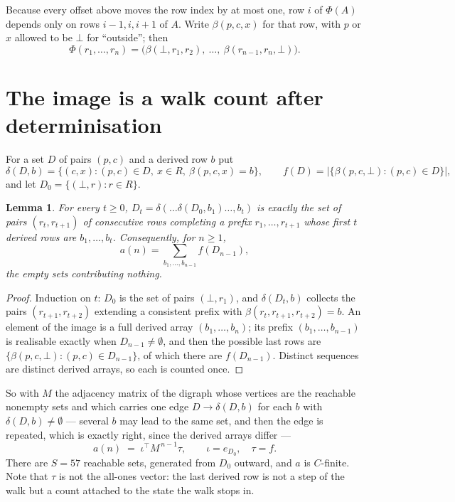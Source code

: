 \documentclass[11pt,a4paper]{article}
\theoremstyle{plain}
\newtheorem{lemma}[theorem]{Lemma}
\theoremstyle{definition}
\begin{document}
Because every offset above moves the row index by at most one, row $i$ of
$\Phi(A)$ depends only on rows $i-1,i,i+1$ of $A$. Write $\beta(p,c,x)$ for that row, with $p$
or $x$ allowed to be $\bot$ for ``outside''; then
\[
\Phi(r_1,\dots,r_n)=\bigl(\beta(\bot,r_1,r_2),\ \dots,\ \beta(r_{n-1},r_n,\bot)\bigr).
\]

\section{The image is a walk count after determinisation}

For a set $D$ of pairs $(p,c)$ and a derived row $b$ put
\[
\delta(D,b)=\{(c,x):(p,c)\in D,\ x\in R,\ \beta(p,c,x)=b\},\qquad
f(D)=\bigl|\{\beta(p,c,\bot):(p,c)\in D\}\bigr| ,
\]
and let $D_0=\{(\bot,r):r\in R\}$.

\begin{lemma}\label{lem:det}
For every $t\ge0$, $D_t=\delta(\dots\delta(D_0,b_1)\dots,b_t)$ is exactly the set of pairs
$(r_t,r_{t+1})$ of consecutive rows completing a prefix $r_1,\dots,r_{t+1}$ whose first $t$
derived rows are $b_1,\dots,b_t$. Consequently, for $n\ge1$,
\[
a(n)=\sum_{b_1,\dots,b_{n-1}}f(D_{n-1}),
\]
the empty sets contributing nothing.
\end{lemma}

\begin{proof}
Induction on $t$: $D_0$ is the set of pairs $(\bot,r_1)$, and $\delta(D_t,b)$ collects the
pairs $(r_{t+1},r_{t+2})$ extending a consistent prefix with
$\beta(r_t,r_{t+1},r_{t+2})=b$. An element of the image is a full derived array
$(b_1,\dots,b_n)$; its prefix $(b_1,\dots,b_{n-1})$ is realisable exactly when
$D_{n-1}\neq\emptyset$, and then the possible last rows are
$\{\beta(p,c,\bot):(p,c)\in D_{n-1}\}$, of which there are $f(D_{n-1})$. Distinct sequences
are distinct derived arrays, so each is counted once.
\end{proof}

So with $M$ the adjacency matrix of the digraph whose vertices are the reachable nonempty sets
and which carries one edge $D\to\delta(D,b)$ for each $b$ with $\delta(D,b)\neq\emptyset$ ---
several $b$ may lead to the same set, and then the edge is repeated, which is exactly right,
since the derived arrays differ ---
\[
a(n)\;=\;\iota^{\!\top}M^{\,n-1}\tau,\qquad \iota=e_{D_0},\quad \tau=f .
\]
There are $S=57$ reachable sets, generated from $D_0$ outward, and $a$ is $C$-finite.
Note that $\tau$ is not the all-ones vector: the last derived row is not a
step of the walk but a count attached to the state the walk stops in.
\end{document}
